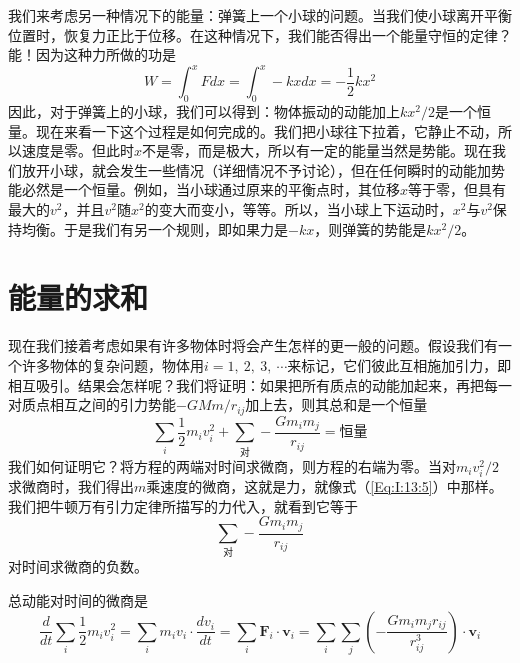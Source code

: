 我们来考虑另一种情况下的能量：弹簧上一个小球的问题。当我们使小球离开平衡位置时，恢复力正比于位移。在这种情况下，我们能否得出一个能量守恒的定律？能！因为这种力所做的功是
\begin{equation}
    \label{Eq:I:13:13}
    W=\int_{0}^{x} Fdx =\int_{0}^{x} -kxdx=-\frac{1}{2}kx^2 
\end{equation}
因此，对于弹簧上的小球，我们可以得到：物体振动的动能加上$kx^2/2$是一个恒量。现在来看一下这个过程是如何完成的。我们把小球往下拉着，它静止不动，所以速度是零。但此时$x$不是零，而是极大，所以有一定的能量当然是势能。现在我们放开小球，就会发生一些情况（详细情况不予讨论），但在任何瞬时的动能加势能必然是一个恒量。例如，当小球通过原来的平衡点时，其位移$x$等于零，但具有最大的$v^2$，并且$v^2$随$x^2$的变大而变小，等等。所以，当小球上下运动时，$x^2$与$v^2$保持均衡。于是我们有另一个规则，即如果力是$-kx$，则弹簧的势能是$kx^2/2$。

\section{能量的求和}

现在我们接着考虑如果有许多物体时将会产生怎样的更一般的问题。假设我们有一个许多物体的复杂问题，物体用$i=1,~2,~3,~\cdots$来标记，它们彼此互相施加引力，即相互吸引。结果会怎样呢？我们将证明：如果把所有质点的动能加起来，再把每一对质点相互之间的引力势能$-GMm/r_{ij}$加上去，则其总和是一个恒量
\begin{equation}
    \label{Eq:I:13:14}
    \sum_{i} \frac{1}{2}m_iv_i^2 + \sum_{\text{对}} -\frac{Gm_im_j}{r_{ij}}=\text{恒量}
\end{equation}
我们如何证明它？将方程的两端对时间求微商，则方程的右端为零。当对$m_iv_i^2/2$求微商时，我们得出$m$乘速度的微商，这就是力，就像式（\ref{Eq:I:13:5}）中那样。我们把牛顿万有引力定律所描写的力代入，就看到它等于
\begin{equation*}
    \sum_{\text{对}} -\frac{Gm_im_j}{r_{ij}}
\end{equation*}
对时间求微商的负数。

总动能对时间的微商是
\begin{equation}
    \label{Eq:I:13:15}
    \frac{d}{dt} \sum_{i} \frac{1}{2}m_iv_i^2 = \sum_i m_iv_i \cdot \frac{dv_i}{dt} = \sum_i \boldsymbol{F}_i \cdot \boldsymbol{v}_i = \sum_i \sum_j (-\frac{Gm_im_jr_{ij}}{r_{ij}^3}) \cdot \boldsymbol{v}_i
\end{equation}

